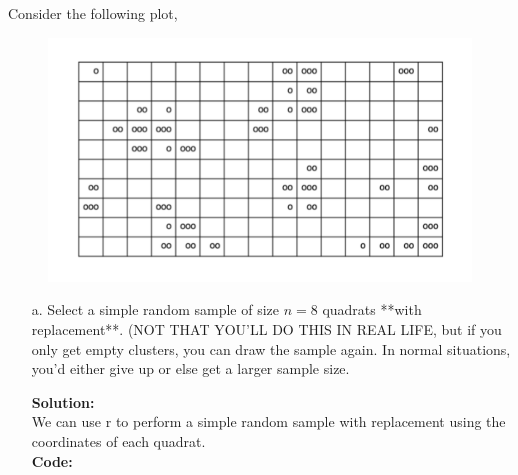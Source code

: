 \documentclass[12pt]{article}
\makeatletter
\theoremstyle{homework}
\newenvironment{exercise}[1]
{\def\@currentlabel{#1}\exercisecore}
{\endexercisecore}
\newcommand{\localhead}[1]{\par\smallskip\noindent\textbf{#1}\nobreak\\}%
\newcommand\solution{\localhead{Solution:}}
\makeatother
\begin{document}
\begin{exercise}{4} Consider the following plot, 
  \begin{figure}[H]
    \begin{center}
    \includegraphics[width = .9\textwidth]{adaptivesampling.png}
    \end{center}
  \end{figure}
  
  \begin{enumerate}
    \item[a.] Select a simple random sample of size $n=8$ quadrats **with replacement**. 
    (NOT THAT YOU'LL DO THIS IN REAL LIFE, but if you only get empty clusters, you can draw 
    the sample again. In normal situations, you'd either give up or else get a larger sample size.\\
    \solution 
    We can use r to perform a simple random sample with replacement using the coordinates of each quadrat. \\
    \textbf{Code:}
\begin{center}
   
\end{center}
\vspace{1in}


\end{enumerate}
\end{exercise}
\end{document}

